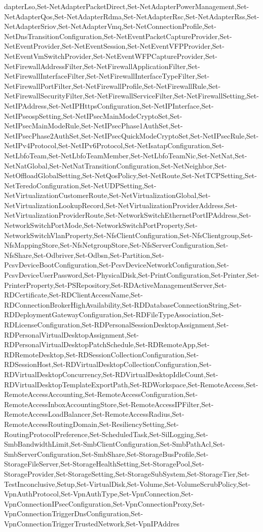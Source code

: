 {{dapterLso,Set-NetAdapterPacketDirect,Set-NetAdapterPowerManagement,Set-NetAdapterQos,Set-NetAdapterRdma,Set-NetAdapterRsc,Set-NetAdapterRss,Set-NetAdapterSriov,Set-NetAdapterVmq,Set-NetConnectionProfile,Set-NetDnsTransitionConfiguration,Set-NetEventPacketCaptureProvider,Set-NetEventProvider,Set-NetEventSession,Set-NetEventVFPProvider,Set-NetEventVmSwitchProvider,Set-NetEventWFPCaptureProvider,Set-NetFirewallAddressFilter,Set-NetFirewallApplicationFilter,Set-NetFirewallInterfaceFilter,Set-NetFirewallInterfaceTypeFilter,Set-NetFirewallPortFilter,Set-NetFirewallProfile,Set-NetFirewallRule,Set-NetFirewallSecurityFilter,Set-NetFirewallServiceFilter,Set-NetFirewallSetting,Set-NetIPAddress,Set-NetIPHttpsConfiguration,Set-NetIPInterface,Set-NetIPseospSetting,Set-NetIPsecMainModeCryptoSet,Set-NetIPsecMainModeRule,Set-NetIPsecPhase1AuthSet,Set-NetIPsecPhase2AuthSet,Set-NetIPsecQuickModeCryptoSet,Set-NetIPsecRule,Set-NetIPv4Protocol,Set-NetIPv6Protocol,Set-NetIsatapConfiguration,Set-NetLbfoTeam,Set-NetLbfoTeamMember,Set-NetLbfoTeamNic,Set-NetNat,Set-NetNatGlobal,Set-NetNatTransitionConfiguration,Set-NetNeighbor,Set-NetOffloadGlobalSetting,Set-NetQosPolicy,Set-NetRoute,Set-NetTCPSetting,Set-NetTeredoConfiguration,Set-NetUDPSetting,Set-NetVirtualizationCustomerRoute,Set-NetVirtualizationGlobal,Set-NetVirtualizationLookupRecord,Set-NetVirtualizationProviderAddress,Set-NetVirtualizationProviderRoute,Set-NetworkSwitchEthernetPortIPAddress,Set-NetworkSwitchPortMode,Set-NetworkSwitchPortProperty,Set-NetworkSwitchVlanProperty,Set-NfsClientConfiguration,Set-NfsClientgroup,Set-NfsMappingStore,Set-NfsNetgroupStore,Set-NfsServerConfiguration,Set-NfsShare,Set-Odbriver,Set-Odbsn,Set-Partition,Set-PcsvDeviceBootConfiguration,Set-PcsvDeviceNetworkConfiguration,Set-PcsvDeviceUserPassword,Set-PhysicalDisk,Set-PrintConfiguration,Set-Printer,Set-PrinterProperty,Set-PSRepository,Set-RDActiveManagementServer,Set-RDCertificate,Set-RDClientAccessName,Set-RDConnectionBrokerHighAvailability,Set-RDDatabaseConnectionString,Set-RDDeploymentGatewayConfiguration,Set-RDFileTypeAssociation,Set-RDLicenseConfiguration,Set-RDPersonalSessionDesktopAssignment,Set-RDPersonalVirtualDesktopAssignment,Set-RDPersonalVirtualDesktopPatchSchedule,Set-RDRemoteApp,Set-RDRemoteDesktop,Set-RDSessionCollectionConfiguration,Set-RDSessionHost,Set-RDVirtualDesktopCollectionConfiguration,Set-RDVirtualDesktopConcurrency,Set-RDVirtualDesktopIdleCount,Set-RDVirtualDesktopTemplateExportPath,Set-RDWorkspace,Set-RemoteAccess,Set-RemoteAccessAccounting,Set-RemoteAccessConfiguration,Set-RemoteAccessInboxAccountingStore,Set-RemoteAccessIPFilter,Set-RemoteAccessLoadBalancer,Set-RemoteAccessRadius,Set-RemoteAccessRoutingDomain,Set-ResiliencySetting,Set-RoutingProtocolPreference,Set-ScheduledTask,Set-SilLogging,Set-SmbBandwidthLimit,Set-SmbClientConfiguration,Set-SmbPathAcl,Set-SmbServerConfiguration,Set-SmbShare,Set-StorageBusProfile,Set-StorageFileServer,Set-StorageHealthSetting,Set-StoragePool,Set-StorageProvider,Set-StorageSetting,Set-StorageSubSystem,Set-StorageTier,Set-TestInconclusive,Setup,Set-VirtualDisk,Set-Volume,Set-VolumeScrubPolicy,Set-VpnAuthProtocol,Set-VpnAuthType,Set-VpnConnection,Set-VpnConnectionIPsecConfiguration,Set-VpnConnectionProxy,Set-VpnConnectionTriggerDnsConfiguration,Set-VpnConnectionTriggerTrustedNetwork,Set-VpnIPAddres}}
